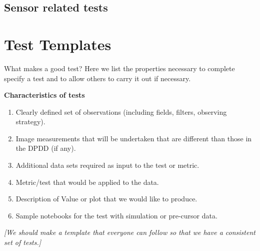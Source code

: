 \documentclass[modern]{desc-tex/styles/lsstdescnote}
\begin{document}
\subsection{Sensor related tests}

\appendix
\section{Test Templates}

What makes a good test?  Here we list the properties necessary to complete specify a test and to allow others to carry it out if necessary.

{\bf Characteristics of tests }
\begin{enumerate}
\item Clearly defined set of observations (including fields, filters, observing strategy).
\item Image measurements that will be undertaken that are different than those in the DPDD (if any).
\item Additional data sets required as input to the test or metric.
\item Metric/test that would be applied to the data.
\item Description of Value or plot  that we would like to produce.
\item Sample notebooks for the test with simulation or pre-cursor data.
\end{enumerate}

{\it [We should make a template that everyone can follow so that we have a consistent set of tests.]}

\begin{acknowledgments}

\end{acknowledgments}


\end{document}
